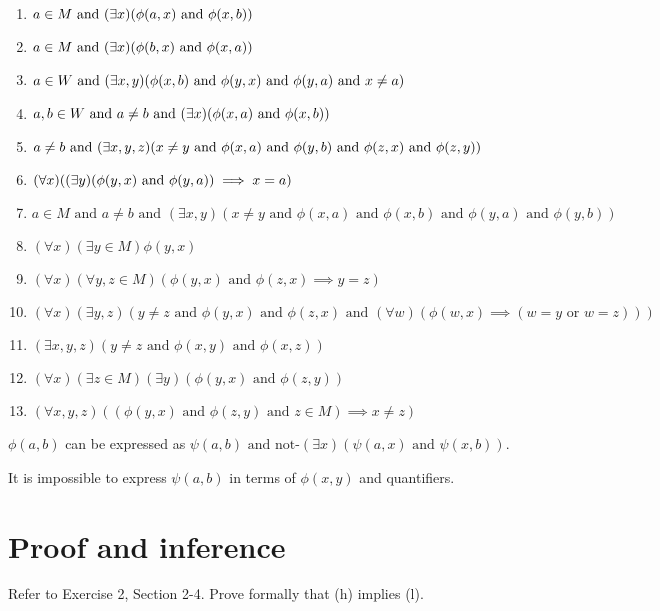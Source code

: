 \documentclass{report}
\renewcommand*{\land}{\text{ and }}
\renewcommand*{\lor}{\text{ or }}
\newcommand*{\lnotd}{\text{not-}}
\begin{document}
\begin{solution}
\begin{enumerate}[label=(\alph*)]
    \item $a\in M\land (\exists x)\prn{\phi(a,x)\land \phi(x, b)}$
    \item $a\in M\land (\exists x)\prn{\phi(b,x)\land \phi(x, a)}$
    \item $a\in W\land (\exists x, y)\prn{\phi(x,b)\land \phi(y, x)\land \phi(y,a)\land x\neq a}$
    \item $a,b\in W\land a\neq b\land (\exists x)\prn{\phi(x, a)\land \phi(x, b)}$
    \item $a\neq b\land (\exists x, y, z)\prn{x\neq y\land \phi(x,a)\land \phi(y,b)\land \phi(z, x)\land \phi(z,y)}$
    \item $(\forall x)\prn{(\exists y)(\phi(y,x)\land \phi(y, a))\implies x = a}$
    \item $a\in M\land a\neq b\land (\exists x,y)(x\neq y\land \phi(x,a)\land \phi(x,b)\land \phi(y,a)\land \phi(y,b))$
    \item $(\forall x)(\exists y\in M)\phi(y, x)$
    \item $(\forall x)(\forall y,z\in M)(\phi(y, x)\land \phi(z,x) \implies y = z)$
    \item $(\forall x)(\exists y,z)(y\neq z\land \phi(y, x)\land \phi(z,x)
    \land (\forall w)(\phi(w,x)\implies (w=y\lor w=z)))$
    \item $(\exists x,y,z)(y\neq z\land \phi(x,y)\land \phi(x,z))$
    \item $(\forall x)(\exists z\in M)(\exists y)(\phi(y, x)\land \phi(z,y))$
    \item $(\forall x,y,z)((\phi(y, x)\land \phi(z,y)\land z\in M) \implies x\neq z)$
\end{enumerate}

$\phi(a,b)$ can be expressed as $\psi(a,b)\land \lnotd(\exists x)(\psi(a,x)\land \psi(x,b))$.

It is impossible to express $\psi(a, b)$ in terms of $\phi(x, y)$ and quantifiers.
\end{solution}


\section{Proof and inference}

\begin{exercise}
Refer to Exercise 2, Section 2-4. Prove formally that (h) implies (l).
\end{exercise}
\end{document}
